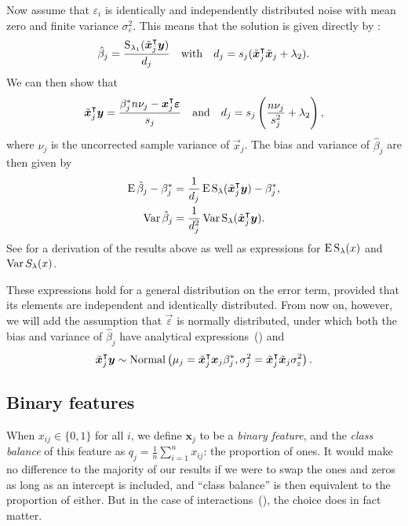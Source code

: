 Now assume that \(\varepsilon_i\) is identically and independently distributed noise with
mean zero and finite variance \(\sigma_\varepsilon^2\). This means that the solution is
given directly by :
\[
  \hat{\beta}_j = \frac{\operatorname{S}_{\lambda_1}(\tilde{\bm{x}}_j^\intercal \bm{y})}{d_j}\quad\text{with}\quad d_j = s_j(\tilde{\bm{x}}_j^\intercal \tilde{\bm{x}}_j + \lambda_2).
\]
We can then show that
\begin{equation}
  \label{eq:z-d}
  \tilde{\bm{x}}_j^\intercal \bm{y} = \frac{\beta_j^* n \nu_j- \bm{x}_j^\intercal \bm{\varepsilon}}{s_j}
  \quad\text{and}\quad
  d_j = s_j\left(\frac{n \nu_j}{s_j^2} + \lambda_2\right),
\end{equation}
where \(\nu_j\) is the uncorrected sample variance of \(\vec{x}_j\).
The bias and variance of \(\hat{\beta}_j\) are then given by
\begin{align}
  \operatorname{E} \hat\beta_j - \beta_j^* & = \frac{1}{d_j}\operatorname{E} \operatorname{S}_\lambda(\tilde{\bm{x}}_j^\intercal \bm{y}) - \beta^*_j,\label{eq:bias} \\
  \operatorname{Var} \hat\beta_j           & = \frac{1}{d_j^2} \operatorname{Var} \operatorname{S}_\lambda(\tilde{\bm{x}}_j^\intercal \bm{y}).\label{eq:variance}
\end{align}
See  for a derivation of the results above
as well as expressions for \(\operatorname{E} \operatorname{S}_\lambda(x)\) and \(\operatorname{Var} S_\lambda(x)\).

These expressions hold for a general distribution on the error term, provided that its
elements are independent and identically distributed. From now on, however, we will add the
assumption that \(\vec{\varepsilon}\) is normally distributed, under which both the bias
and variance of \(\hat{\beta}_j\) have analytical
expressions~() and
\[
  \tilde{\bm{x}}_j^\intercal \bm{y} \sim \operatorname{Normal}\left(\mu_j = \tilde{\bm{x}}_j^\intercal\bm{x}_j \beta_j^*, \sigma_j^2 = \tilde{\bm{x}}_j^\intercal\tilde{\bm{x}}_j \sigma_\varepsilon^2 \right).
\]

\subsection{Binary features}%
\label{sec:theory-binary-features}

When \(x_{ij} \in \{0, 1\}\) for all \(i\), we define \(\bm{x}_j\) to be a \emph{binary
  feature}, and the \emph{class balance} of this feature as \(q_j =
\frac{1}{n}\sum_{i=1}^n{x_{ij}}\): the proportion of ones. It would make no difference to
the majority of our results if we were to swap the ones and zeros as long as an intercept
is included, and ``class balance'' is then equivalent to the proportion of either. But in
the case of interactions~(), the choice does in fact matter.

